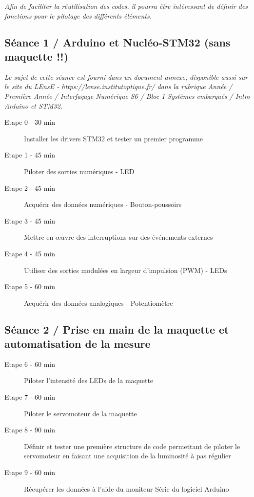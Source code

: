 \documentclass[a4paper,11pt,titlepage]{article} %
\begin{document}
\textit{Afin de faciliter la réutilisation des codes, il pourra être intéressant de définir des fonctions pour le pilotage des différents éléments.}

\subsection{Séance 1 / Arduino et Nucléo-STM32 (sans maquette !!)}

\textit{Le sujet de cette séance est fourni dans un document annexe, disponible aussi sur le site du LEnsE - https://lense.institutoptique.fr/ dans la rubrique Année / Première Année / Interfaçage Numérique S6 / Bloc 1 Systèmes embarqués / Intro Arduino et STM32.}

	\begin{description}
		\item[Etape 0 - 30 min] Installer les drivers STM32 et tester un premier programme
		\item[Etape 1 - 45 min] Piloter des sorties numériques - LED
		\item[Etape 2 - 45 min] Acquérir des données numériques - Bouton-poussoirs
		\item[Etape 3 - 45 min] Mettre en \oe{}uvre des interruptions sur des événements externes
		\item[Etape 4 - 45 min] Utiliser des sorties modulées en largeur d'impulsion (PWM) - LEDs
		\item[Etape 5 - 60 min] Acquérir des données analogiques - Potentiomètre
	\end{description}	

\subsection{Séance 2 / Prise en main de la maquette et automatisation de la mesure}

	\begin{description}
		\item[Etape 6 - 60 min] Piloter l'intensité des LEDs de la maquette
		\item[Etape 7 - 60 min] Piloter le servomoteur de la maquette
		\item[Etape 8 - 90 min] Définir et tester une première structure de code permettant de piloter le servomoteur en faisant une acquisition de la luminosité à pas régulier
		\item[Etape 9 - 60 min] Récupérer les données à l'aide du moniteur Série du logiciel Arduino
	\end{description}
	
\end{document}
